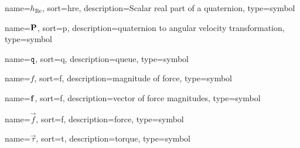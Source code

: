 	{%
		name=\ensuremath{h_{\mathrm{Re}}}, %
		sort=hre,
		description=Scalar real part of a quaternion,
		type=symbol
	}
	\newcommand{\quaternionre}{\gls{sym:quaternionre}}

	{%
		name=\ensuremath{\mat{P}}, %
		sort=p,
		description=quaternion to angular velocity transformation,
		type=symbol
	}
	\newcommand{\quaternionToAvelTrans}{\gls{sym:quaternionToAvelTrans}}

	{%
		name=\ensuremath{\code{q}},
		sort=q,
		description=queue,
		type=symbol
	}
	\newcommand{\queue}{\gls{sym:queue}}

	{%
		name=\ensuremath{f},
		sort=f,
		description=magnitude of force,
		type=symbol
	}
	\newcommand{\forcemag}{\gls{sym:forcemag}}

	{%
		name=\ensuremath{\mat{f}},
		sort=f,
		description=vector of force magnitudes,
		type=symbol
	}
	\newcommand{\forcemagvec}{\gls{sym:forcemagvec}}

	{%
		name=\ensuremath{\vec{f}},
		sort=f,
		description=force,
		type=symbol
	}
	\newcommand{\force}{\gls{sym:force}}

	{%
		name=\ensuremath{\vec{\tau}},
		sort=t,
		description=torque,
		type=symbol
	}
	\newcommand{\torque}{\gls{sym:torque}}

